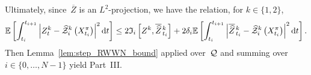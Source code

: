 Ultimately, since~$\overline{Z}$ is an $L^2$-projection, we have the relation, for $k\in\{1,2\}$,
\begin{equation}
\mathbb{E}\left[ \int_{t_i}^{t_{i+1}}\left|Z_t^k-\widehat{\mathcal{Z}}^k_i\left(X^\pi_{t_i}\right)\right|^2 \mathrm{d} t\right] \leq 2\mathfrak{I}_i\left[Z^k, \overline{\widehat{Z}}\kern0.1em^{k}_{t_i}\right] + 2\delta_{i}  \mathbb{E}\left[ \int_{t_i}^{t_{i+1}}\left|\overline{\widehat{Z}}\kern0.1em^{k}_{t_{i}}-\widehat{\mathcal{Z}}^k_i\left(X^\pi_{t_i}\right)\right|^2 \mathrm{d} t\right].
\end{equation}
Then Lemma~\ref{lem:step_RWWN_bound} applied over~$\mathcal{Q}$ and summing over $i\in\{0,\dots,N-1\}$ yield Part~III.
